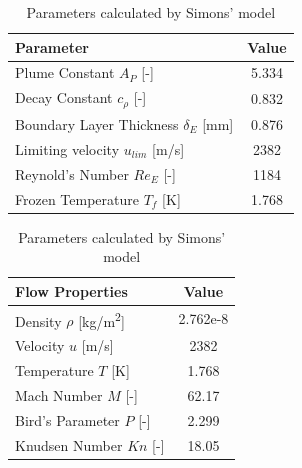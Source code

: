 \documentclass[journal]{new-aiaa}
\begin{document}
\begin{table}[H]
    \centering
    \caption{Parameters calculated by Simons' model}
    \begin{minipage}{0.48\textwidth}
        \centering
        \begin{tabularx}{0.9\columnwidth}{Xc}
        \hline
        \hline
        Parameter & Value \\
        \hline
        Plume Constant $A_P$ [-] & 5.334 \\
        Decay Constant $c_{\rho}$ [-] & 0.832 \\
        Boundary Layer Thickness $\delta_E$ [mm] & 0.876 \\
        Limiting velocity $u_{lim}$ [m/s] & 2382 \\
        Reynold's Number $Re_E$ [-] & 1184 \\
        Frozen Temperature $T_f$ [K] & 1.768 \\
        \hline
        \hline
        \end{tabularx}
    \end{minipage}%
    \hfill
    \begin{minipage}{0.48\textwidth}
        \centering
        \begin{tabularx}{0.9\columnwidth}{Xc}
        \hline
        \hline
        Flow Properties & Value \\
        \hline
        Density $\rho$ [kg/m\textsuperscript{2}] & 2.762e-8 \\
        Velocity $u$ [m/s] & 2382 \\
        Temperature $T$ [K] & 1.768 \\
        Mach Number $M$ [-]& 62.17 \\
        Bird's Parameter $P$ [-] & 2.299 \\
        Knudsen Number $Kn$ [-] & 18.05 \\
        \hline
        \hline
        \end{tabularx}
    \end{minipage}
    \label{method_table_simonsResults}
\end{table}
\end{document}
